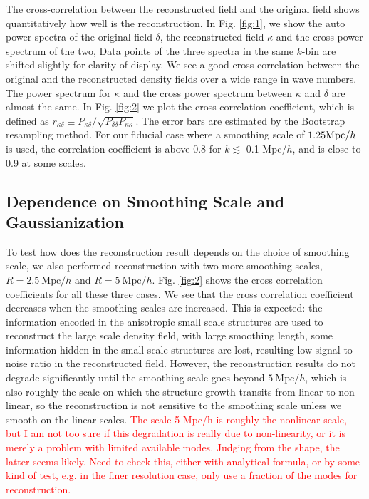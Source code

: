 \documentclass[aps,prd,twocolumn,showpacs,superscriptaddress,groupedaddress,nofootinbib]{revtex4}  %
\newcommand{\mr}{\mathrm}
\def\Mpc{{\rm Mpc}}
\begin{document}
The cross-correlation between the reconstructed field and the original field shows quantitatively how well is 
the reconstruction. In Fig. \ref{fig:1}, we show the auto power spectra of the original field $\delta$, 
the reconstructed field $\kappa$ and the cross power spectrum of the two,
Data points of the three spectra in the same $k$-bin are shifted slightly for clarity of display. 
We see a good cross correlation between the original and the reconstructed 
density fields over a wide range in wave numbers. The power spectrum for $\kappa$
and the cross power spectrum between $\kappa$ and $\delta$ are almost the same.
In Fig. \ref{fig:2} we plot the cross correlation coefficient, which is defined as 
$r_{\kappa\delta} \equiv {P_{\kappa\delta}}/{\sqrt{P_{\delta\delta}
P_{\kappa\kappa}}}$. 
The error bars are estimated by the Bootstrap resampling method.
For our fiducial case where a smoothing scale of $1.25 \Mpc/h$ is used, 
the correlation coefficient is above 0.8 for $k\lesssim$ 0.1 Mpc/$h$,  and is close to 0.9 at some scales. 

\subsection{Dependence on Smoothing Scale and Gaussianization}
To test how does the reconstruction result depends on the choice of smoothing scale, 
we also performed reconstruction with two more smoothing scales, 
$R=2.5\ \mr{Mpc}/h$ and $R=5\ \mr{Mpc}/h$. 
Fig. \ref{fig:2} shows the cross correlation coefficients
for all these three cases. We see that 
the cross correlation coefficient decreases when the smoothing scales are increased. This 
is expected: the information encoded in the anisotropic small scale structures are used to reconstruct the large scale density field, with large smoothing length, some information 
hidden in the small scale structures are lost, resulting low signal-to-noise ratio in the reconstructed
field. However,  the reconstruction results do not degrade significantly
until the smoothing scale goes beyond $5\ \mr{Mpc}/h$, which is also roughly the scale on which the structure growth transits from linear to non-linear,  so the reconstruction is not sensitive to the smoothing scale unless we smooth on the linear scales. \textcolor{red}{The scale 5 Mpc/h is 
roughly the nonlinear scale, but I am not too sure if this degradation is really due to non-linearity, or it is merely a problem with limited available
modes. Judging from the shape, the latter seems likely. Need to check this, either with analytical formula, or by some kind of test, e.g. in the finer resolution case, only use a fraction of the modes
for reconstruction.}
\end{document}
